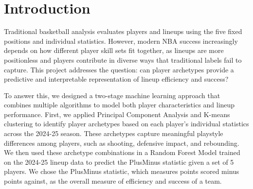 \documentclass{article}
\begin{document}

\begin{abstract}
This project predicts the efficiency of NBA lineups based on combinations of player archetypes. 
We began by using PCA analysis and K-means++ to identify and define player archetypes within 
each basketball position. Once we have defined clusters from 2024-25 season statistics, these 
clusters enable us to label every player according to their attributes by more categories than 
traditional positions. We then used these labels to predict future lineup efficiency using season 
data to train and validate a Random Forest model capable of predicting lineup efficiency. Through 
our analysis we assessed whether player type and combinations of specific attributes can reveal 
the most efficient NBA lineup. This data-driven analysis reveals the player archetype combinations 
that will lead to success in the NBA.
\end{abstract}

\section{Introduction}
\label{introduction}

Traditional basketball analysis evaluates players and lineups using the five fixed positions and 
individual statistics. However, modern NBA success increasingly depends on how different player 
skill sets fit together, as lineups are more positionless and players contribute in diverse ways 
that traditional labels fail to capture. This project addresses the question: can player archetypes 
provide a predictive and interpretable representation of lineup efficiency and success?

To answer this, we designed a two-stage machine learning approach that combines multiple algorithms 
to model both player characteristics and lineup performance. First, we applied Principal Component 
Analysis and K-means clustering to identify player archetypes based on each player's individual 
statistics across the 2024-25 season. These archetypes capture meaningful playstyle differences 
among players, such as shooting, defensive impact, and rebounding. We then used these archetype 
combinations in a Random Forest Model trained on the 2024-25 lineup data to predict the PlusMinus 
statistic given a set of 5 players. We chose the PlusMinus statistic, which measures points scored 
minus points against, as the overall measure of efficiency and success of a team. 
\end{document}

